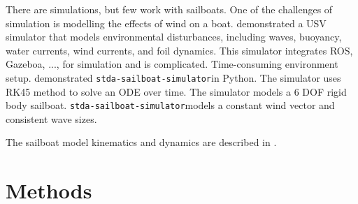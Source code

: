 \documentclass[conference]{IEEEtran}
\newcommand{\Sim}{\lstinline{stda-sailboat-simulator}}
\begin{document}
There are simulations, but few work with sailboats. One of the challenges of simulation is modelling the effects of wind on a boat. \cite{Paravisi2019} demonstrated a USV simulator that models environmental disturbances, including waves, buoyancy, water currents, wind currents, and foil dynamics. This simulator integrates ROS, Gazeboa, ..., for simulation and is complicated. Time-consuming environment setup. \cite{Buehler2018} demonstrated \Sim in Python. The simulator uses RK45 method to solve an ODE over time. The simulator models a 6 DOF rigid body sailboat. \Sim models a constant wind vector and consistent wave sizes.

The sailboat model kinematics and dynamics are described in \cite{Buehler2018}.



\section{Methods}
\end{document}

